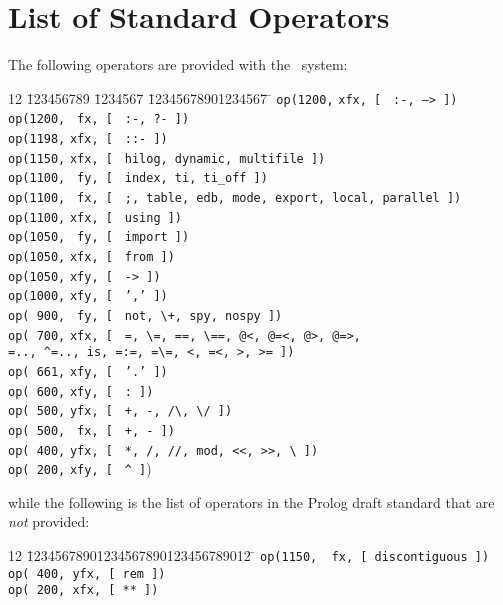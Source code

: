 \section{List of Standard Operators} \label{operator_list}
The following operators are provided with the \ourprolog\ system:
\begin{tabbing}
12 \= 123456789 \= 1234567 \= 12345678901234567 \=	\kill
 \> {\tt op(1200,} \> \verb|xfx, [ | \> {\tt :-, --> ])}\>		\\
 \> {\tt op(1200,} \> \verb| fx, [ | \> {\tt :-, ?- ])}	\>		\\
 \> {\tt op(1198,} \> \verb|xfx, [ | \> {\tt ::- ])}	\>		\\
 \> {\tt op(1150,} \> \verb|xfx, [ | \> {\tt hilog, dynamic, multifile ])} \> \\
 \> {\tt op(1100,} \> \verb| fy, [ | \> {\tt index, ti, ti\_off ])}	\> \\
 \> {\tt op(1100,} \> \verb| fx, [ | \> {\tt ;, table, edb, mode, export,
						local, parallel ])} \> \\
 \> {\tt op(1100,} \> \verb|xfx, [ | \> {\tt using ])}	\>		\\
 \> {\tt op(1050,} \> \verb| fy, [ | \> {\tt import ])}	\>		\\
 \> {\tt op(1050,} \> \verb|xfx, [ | \> {\tt from ])}	\>		\\
 \> {\tt op(1050,} \> \verb|xfy, [ | \> {\tt -> ])}	\>		\\
 \> {\tt op(1000,} \> \verb|xfy, [ | \> {\tt ',' ])}	\>		\\
 \> {\tt op( 900,} \> \verb| fy, [ | \> {\verb|not, \+, spy, nospy ])|}  \> \\
 \> {\tt op( 700,} \> \verb|xfx, [ | \> {\verb|=, \=, ==, \==, @<, @=<, @>, @=>,|} \>	\\
 \>		   \>		     \> {\verb|=.., ^=.., is, =:=, =\=, <, =<, >, >= ])|}	\> \\
 \> {\tt op( 661,} \> \verb|xfy, [ | \> {\tt '.' ])}	\>		\\
 \> {\tt op( 600,} \> \verb|xfy, [ | \> {\verb|: ])|}	\>		\\
 \> {\tt op( 500,} \> \verb|yfx, [ | \> {\verb|+, -, /\, \/ ])|}	\> \\
 \> {\tt op( 500,} \> \verb| fx, [ | \> {\verb|+, - ])|}		\> \\
 \> {\tt op( 400,} \> \verb|yfx, [ | \> {\verb|*, /, //, mod, <<, >>, \ ])|} \>	\\
 \> {\tt op( 200,} \> \verb|xfy, [ | \> {\verb|^ ]|)}	\>	\\
\end{tabbing}
while the following is the list of operators in the Prolog draft standard
that are {\em not} provided:
\begin{tabbing}
12 \= 12345678901234567890123456789012 \=	\kill
 \> {\tt op(1150, \ fx, [ discontiguous ])}	\>		\\
 \> {\tt op( 400,  yfx, [ rem ])}	\>	\\
 \> {\tt op( 200,  xfx, [ ** ])}	\>	\\
\end{tabbing}


